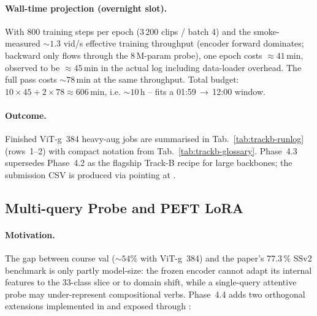 \paragraph{Wall-time projection (overnight slot).}
With \(800\) training steps per epoch (\(3\,200\) clips / batch 4)
and the smoke-measured \(\sim\!1.3\) vid/s effective training
throughput (encoder forward dominates; backward only flows through
the 8\,M-param probe), one epoch costs \(\approx 41\,\)min, observed
to be \(\approx 45\,\)min in the actual log including data-loader
overhead. The full  pass costs \(\sim\!78\,\)min at
the same throughput. Total budget: \(10\times 45 + 2 \times 78
\approx 606\,\)min, i.e. \(\sim\!10\,\)h -- fits a
01:59\,\(\to\)\,12:00 window.

\paragraph{Outcome.}
Finished ViT-g~384 heavy-aug jobs are summarised in
Tab.~\ref{tab:trackb-runlog} (rows~1--2) with compact notation from
Tab.~\ref{tab:trackb-glossary}.  Phase~4.3 supersedes Phase~4.2 as the
flagship Track-B recipe for large backbones; the submission CSV is
produced via  pointing at
.

\subsection{Multi-query Probe and PEFT LoRA}
\label{sec:trackb-peft}

\paragraph{Motivation.}
The gap between course val (\(\sim\!54\%\) with ViT-g~384) and the
paper's \(77.3\,\%\) SSv2 benchmark is only partly model-size: the
frozen encoder cannot adapt its internal features to the 33-class
slice or to domain shift, while a single-query attentive probe may
under-represent compositional verbs. Phase~4.4 adds two orthogonal
extensions implemented in  and
exposed through :


